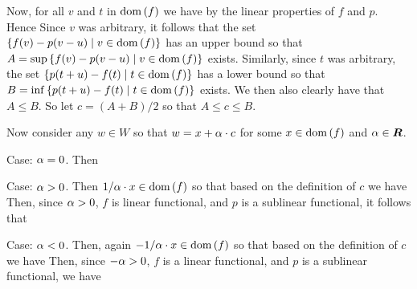 \begin{questions}
{{      Now, for all $v$ and $t$ in $\mathrm{dom}\,(f)$ we have
      by the linear properties of $f$ and $p$.
      Hence
      Since $v$ was arbitrary, it follows that the set $\left\{ f(v) - p(v-u) \mid v \in \mathrm{dom}\,(f) \right\}$ has an upper bound so that $A = \sup\left\{ f(v) - p(v-u) \mid v \in \mathrm{dom}\,(f) \right\}$ exists.
      Similarly, since $t$ was arbitrary, the set $\left\{ p(t + u) - f(t) \mid t \in \mathrm{dom}\,(f) \right\}$ has a lower bound so that $B = \inf\left\{ p(t + u) - f(t) \mid t \in \mathrm{dom}\,(f) \right\}$ exists.
      We then also clearly have that $A \leq B$.
      So let $c = (A + B) / 2$ so that $A \leq c \leq B$.

      Now consider any $w \in W$ so that $w = x + \alpha \cdot c$ for some $x \in \mathrm{dom}\,(f)$ and $\alpha \in {\boldsymbol{R}}$.

      Case: $\alpha = 0$.
      Then

      Case: $\alpha > 0$.
      Then $1/\alpha \cdot x \in \mathrm{dom}\,(f)$ so that based on the definition of $c$ we have
      Then, since $\alpha > 0$, $f$ is linear functional, and $p$ is a sublinear functional, it follows that

      Case: $\alpha < 0$.
      Then, again $-1/\alpha \cdot x \in \mathrm{dom}\,(f)$ so that based on the definition of $c$ we have
      Then, since $-\alpha > 0$, $f$ is a linear functional, and $p$ is a sublinear functional, we have

}}
\end{questions}
